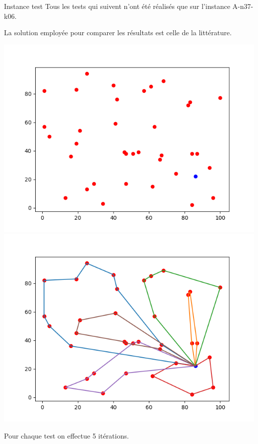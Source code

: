 \documentclass{beamer}
\begin{document}
\begin{frame}{Instance test}
Tous les tests qui suivent n'ont été réalisés que sur l'instance A-n37-k06.

La solution employée pour comparer les résultats est celle de la littérature.

\includegraphics[scale=0.3]{instance3706.png}
\includegraphics[scale=0.3]{best3706.png}

Pour chaque test on effectue 5 itérations.
\end{frame}
\end{document}
